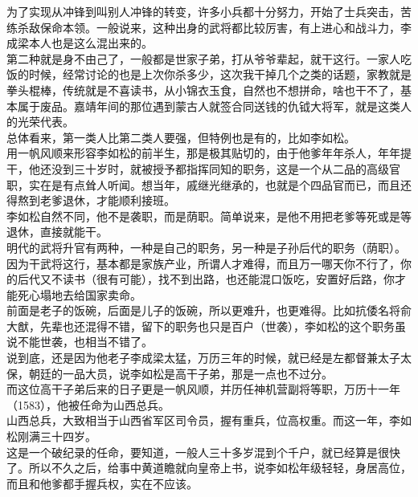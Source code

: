 \begin{multicols}{\theparacolNo}
为了实现从冲锋到叫别人冲锋的转变，许多小兵都十分努力，开始了士兵突击，苦练杀敌保命本领。一般说来，这种出身的武将都比较厉害，有上进心和战斗力，李成梁本人也是这么混出来的。\\

第二种就是身不由己了，一般都是世家子弟，打从爷爷辈起，就干这行。一家人吃饭的时候，经常讨论的也是上次你杀多少，这次我干掉几个之类的话题，家教就是拳头棍棒，传统就是不喜读书，从小锦衣玉食，自然也不想拼命，啥也干不了，基本属于废品。嘉靖年间的那位遇到蒙古人就签合同送钱的仇钺大将军，就是这类人的光荣代表。\\

总体看来，第一类人比第二类人要强，但特例也是有的，比如李如松。\\

用一帆风顺来形容李如松的前半生，那是极其贴切的，由于他爹年年杀人，年年提干，他还没到三十岁时，就被授予都指挥同知的职务，这是一个从二品的高级官职，实在是有点耸人听闻。想当年，戚继光继承的，也就是个四品官而已，而且还得熬到老爹退休，才能顺利接班。\\

李如松自然不同，他不是袭职，而是荫职。简单说来，是他不用把老爹等死或是等退休，直接就能干。\\

明代的武将升官有两种，一种是自己的职务，另一种是子孙后代的职务（荫职）。因为干武将这行，基本都是家族产业，所谓人才难得，而且万一哪天你不行了，你的后代又不读书（很有可能），找不到出路，也还能混口饭吃，安置好后路，你才能死心塌地去给国家卖命。\\

前面是老子的饭碗，后面是儿子的饭碗，所以更难升，也更难得。比如抗倭名将俞大猷，先辈也还混得不错，留下的职务也只是百户（世袭），李如松的这个职务虽说不能世袭，也相当不错了。\\

说到底，还是因为他老子李成梁太猛，万历三年的时候，就已经是左都督兼太子太保，朝廷的一品大员，说李如松是高干子弟，那是一点也不过分。\\

而这位高干子弟后来的日子更是一帆风顺，并历任神机营副将等职，万历十一年（1583），他被任命为山西总兵。\\

山西总兵，大致相当于山西省军区司令员，握有重兵，位高权重。而这一年，李如松刚满三十四岁。\\

这是一个破纪录的任命，要知道，一般人三十多岁混到个千户，就已经算是很快了。所以不久之后，给事中黄道瞻就向皇帝上书，说李如松年级轻轻，身居高位，而且和他爹都手握兵权，实在不应该。\\


\end{multicols}
